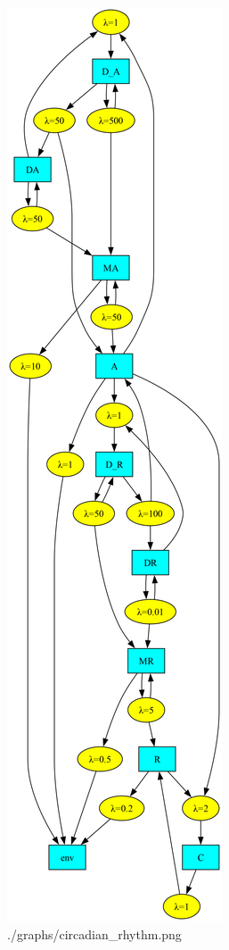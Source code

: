 \documentclass[a4paper]{article}
\begin{document}
  
  \begin{figure}[!htb]
    \centering
    \includegraphics[height=0.95\textheight]{./graphs/circadian_rhythm.png}
    \caption{./graphs/circadian\_rhythm.png}
  \end{figure}
\end{document}
